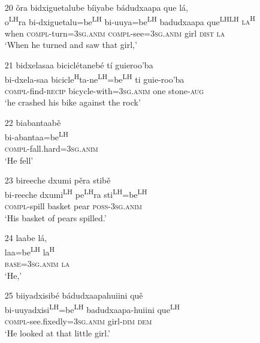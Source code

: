 \begin{itemize}
\item[20]
\glll \v{o}ra bidxiguetalube b\'{i}iyabe b\'{a}dudxaapa que l\'{a},  \\
o\textsuperscript{LH}ra bi-dxiguetalu=be\textsuperscript{LH} bi-uuya=be\textsuperscript{LH} badudxaapa que\textsuperscript{LH}\textsuperscript{LH} \textsc{la\textsuperscript{H}}  \\
when \textsc{compl}-turn=3\textsc{sg.anim} \textsc{compl}-see=3\textsc{sg.anim} girl \textsc{dist} \textsc{la}  \\
\glt `When he turned and saw that girl,'


\item[21]
\glll bidxelasaa bicicl\'{e}taneb\'{e} t\'{i} guieroo'ba  \\
bi-dxela-saa bicicle\textsuperscript{H}ta-ne\textsuperscript{LH}=be\textsuperscript{LH} ti guie-roo'ba  \\
\textsc{compl}-find-\textsc{recip} bicycle-with=3\textsc{sg.anim} one stone-\textsc{aug}  \\
\glt `he crashed his bike against the rock' 


\item[22]
\glll biabantaab\v{e} \\
bi-abantaa=be\textsuperscript{LH} \\
\textsc{compl}-fall.hard=3\textsc{sg.anim}  \\
\glt `He fell'


\item[23]
\glll bireeche dxumi p\v{e}ra stib\v{e}  \\
bi-reeche dxumi\textsuperscript{LH} pe\textsuperscript{LH}ra sti\textsuperscript{LH}=be\textsuperscript{LH}  \\
\textsc{compl}-spill basket pear \textsc{poss}-3\textsc{sg.anim} \\
\glt `His basket of pears spilled.'


\item[24]
\glll laabe l\'{a},  \\
laa=be\textsuperscript{LH} la\textsuperscript{H}  \\
\textsc{base}=3\textsc{sg.anim} \textsc{la}  \\
\glt `He,'


\item[25]
\glll biiyadxisib\'{e} b\'{a}dudxaapahuiini qu\v{e} \\
bi-uuyadxisi\textsuperscript{LH}=be\textsuperscript{LH} badudxaapa-huiini que\textsuperscript{LH}  \\
\textsc{compl}-see.fixedly=3\textsc{sg.anim} girl-\textsc{dim} \textsc{dem} \\
\glt `He looked at that little girl.' 



\end{itemize}
